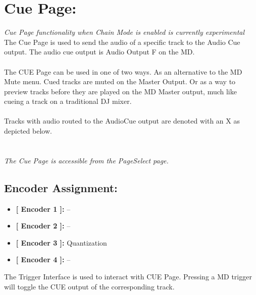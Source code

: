  \chapter{Cue Page:}
 \textit{Cue Page functionality when Chain Mode is enabled is currently experimental}\\
 The Cue Page is used to send the audio of a specific track to the Audio Cue output. The audio cue output is Audio Output F on the MD.\\
 \\
 The CUE Page can be used in one of two ways. As an alternative to the MD Mute menu. Cued tracks are muted on the Master Output. Or as a way to preview tracks before they are played on the MD Master output, much like cueing a track on a traditional DJ mixer.\\
\\Tracks with audio routed to the AudioCue output are denoted with an X as depicted below.\\

\\\\
 \textit{The Cue Page is accessible from the PageSelect page.}
  \section{Encoder Assignment:}
 \begin{itemize}
 	\item \textbf{[ Encoder 1 ]: } --
 	\item \textbf{[ Encoder 2 ]: } --
 	\item \textbf{[ Encoder 3 ]: } Quantization
 	\item \textbf{[ Encoder 4 ]: } --
 \end{itemize}
 The Trigger Interface is used to interact with CUE Page. Pressing a MD trigger will toggle the CUE output of the corresponding track.
 \newpage
